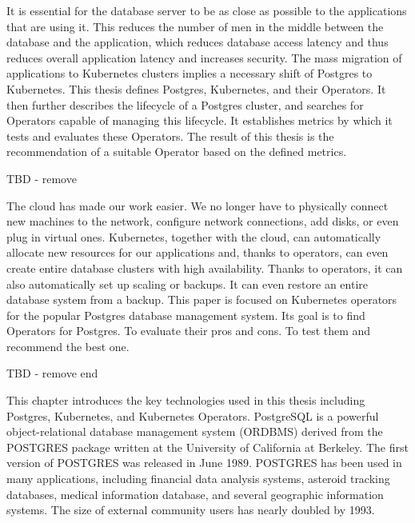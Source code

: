 
It is essential for the database server to be as close as possible to the applications that are using it. This reduces the number of men in the middle between the database and the application, which reduces database access latency and thus reduces overall application latency and increases security. The mass migration of applications to Kubernetes clusters implies a necessary shift of Postgres to Kubernetes. This thesis defines Postgres, Kubernetes, and their Operators. It then further describes the lifecycle of a Postgres cluster, and searches for Operators capable of managing this lifecycle. It establishes metrics by which it tests and evaluates these Operators.  The result of this thesis is the recommendation of a suitable Operator based on the defined metrics.

TBD - remove

The cloud has made our work easier. We no longer have to physically connect new machines to the network, configure network connections, add disks, or even plug in virtual ones. Kubernetes, together with the cloud, can automatically allocate new resources for our applications and, thanks to operators, can even create entire database clusters with high availability. Thanks to operators, it can also automatically set up scaling or backups. It can even restore an entire database system from a backup. This paper is focused on Kubernetes operators for the popular Postgres database management system. Its goal is to find Operators for Postgres. To evaluate their pros and cons. To test them and recommend the best one.

TBD - remove end


This chapter introduces the key technologies used in this thesis including Postgres, Kubernetes, and Kubernetes Operators.
PostgreSQL is a powerful object-relational database management system (ORDBMS) derived from the POSTGRES package written at the University of California at Berkeley. \cite{docuPgwhatIsPg} \cite{pg14introduction} The first version of POSTGRES was released in June 1989. POSTGRES has been used in many applications, including financial data analysis systems, asteroid tracking databases, medical information database, and several geographic information systems. The size of external community users has nearly doubled by 1993. \cite{docuPgBriefHistory}

